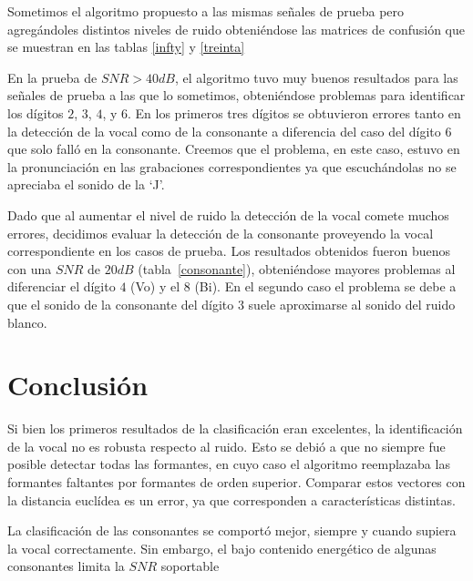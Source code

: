 \documentclass[conference,a4paper,10pt,oneside,final]{tfmpd}
\begin{document}
Sometimos el algoritmo propuesto a las mismas señales de prueba pero
agregándoles distintos niveles de ruido obteniéndose las matrices de
confusión que se muestran en las tablas \ref{infty} y \ref{treinta}

En la prueba de $SNR > 40 dB$, el algoritmo tuvo muy buenos resultados
para las señales de prueba a las que lo sometimos, obteniéndose
problemas para identificar los dígitos $2$, $3$, $4$, y $6$. En los primeros tres
dígitos se obtuvieron errores tanto en la detección de la vocal como
de la consonante a diferencia del caso del dígito $6$ que solo falló
en la consonante. Creemos que el problema, en este caso, estuvo en la
pronunciación en las grabaciones correspondientes ya que escuchándolas
no se apreciaba el sonido de la `J'.

Dado que al aumentar el nivel de ruido la detección de la vocal
comete muchos errores, decidimos evaluar la detección de la consonante
proveyendo la vocal correspondiente en los casos de prueba. Los resultados
obtenidos fueron buenos con una $SNR$ de $20 dB$ (tabla~\ref{consonante}), obteniéndose mayores
problemas al diferenciar  el dígito $4$ (Vo) y el $8$ (Bi). En el segundo
caso el problema se debe a que el sonido de la consonante del dígito
$3$ suele aproximarse al sonido del ruido blanco.

\section{Conclusión}

Si bien los primeros resultados de la clasificación eran excelentes,
la identificación de la vocal no es robusta respecto al ruido.
Esto se debió a que no siempre fue posible detectar todas las formantes,
en cuyo caso el algoritmo reemplazaba las formantes faltantes por formantes de orden superior.
Comparar estos vectores con la distancia euclídea es un error, ya que corresponden a características
distintas.

La clasificación de las consonantes se comportó mejor, siempre y cuando supiera la vocal correctamente.
Sin embargo, el bajo contenido energético de algunas consonantes limita la $SNR$ soportable





\nocite{*}  
\end{document}
